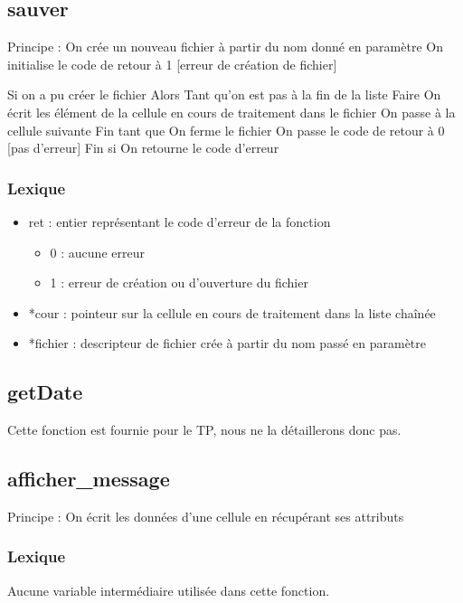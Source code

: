 \documentclass{report}
\begin{document}
      \subsection{sauver}
Principe :
On crée un nouveau fichier à partir du nom donné en paramètre
On initialise le code de retour à 1 [erreur de création de fichier]

Si on a pu créer le fichier Alors
  Tant qu'on est pas à la fin de la liste Faire
    On écrit les élément de la cellule en cours de traitement dans le fichier
    On passe à la cellule suivante
  Fin tant que
  On ferme le fichier
  On passe le code de retour à 0 [pas d'erreur]
Fin si
On retourne le code d'erreur
        
        \subsubsection{Lexique}
        \begin{itemize}
          \item ret : entier représentant le code d'erreur de la fonction
          \begin{itemize}
            \item 0 : aucune erreur
            \item 1 : erreur de création ou d'ouverture du fichier
          \end{itemize}
          \item *cour : pointeur sur la cellule en cours de traitement dans la liste chaînée
          \item *fichier : descripteur de fichier crée à partir du nom passé en paramètre
        \end{itemize}

      \subsection{getDate}
Cette fonction est fournie pour le TP, nous ne la détaillerons donc pas.
      
      \subsection{afficher\_message}
Principe :
On écrit les données d'une cellule en récupérant ses attributs

        \subsubsection{Lexique}
          Aucune variable intermédiaire utilisée dans cette fonction.
      
\end{document}
